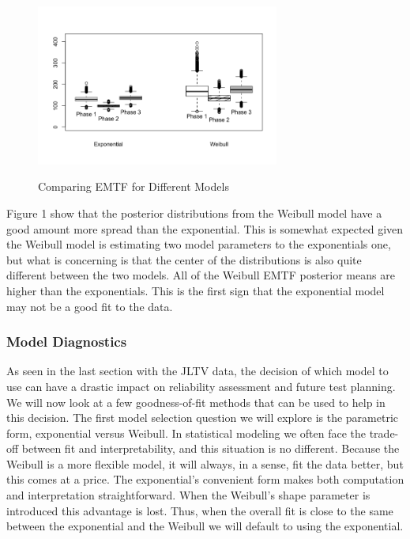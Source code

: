 \documentclass[12pt]{article}
\begin{document}
\begin{figure}
  \centering
      \includegraphics[width=8cm, height=6cm]{Boxplots}
  \caption{Comparing EMTF for Different Models}
\end{figure}

Figure 1 show that the posterior distributions from the Weibull model have a
good amount more spread than the exponential.  This is somewhat expected given
the Weibull model is estimating two model parameters to the exponentials one,
but what is concerning is that the center of the distributions is also quite
different between the two models.  All of the Weibull EMTF posterior means
are higher than the exponentials.  This is the first sign that the exponential
model may not be a good fit to the data.

\pagebreak

\subsubsection{Model Diagnostics}
As seen in the last section with the JLTV data, the decision of which model to
use can have a drastic impact on reliability assessment and future test
planning.  We will now look at a few  goodness-of-fit methods that can be used
to help in this decision.  The first model selection question we will explore is
the parametric form, exponential versus Weibull.  In statistical modeling we
often face the trade-off between fit and interpretability, and this situation is
no different. Because the Weibull is a more flexible model, it will always, in a
sense, fit the data better, but this comes at a price.  The exponential's
convenient form makes both computation and interpretation straightforward.  When
the Weibull's shape parameter is introduced this advantage is lost.  Thus, when
the overall fit is close to the same between the exponential and the Weibull we
will default to using the exponential.
\end{document}
